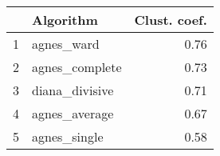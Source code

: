 \begin{tabular}{rlr}
  \toprule
 & Algorithm & Clust. coef. \\ 
  \midrule
1 & agnes\_ward & 0.76 \\ 
  2 & agnes\_complete & 0.73 \\ 
  3 & diana\_divisive & 0.71 \\ 
  4 & agnes\_average & 0.67 \\ 
  5 & agnes\_single & 0.58 \\ 
   \bottomrule
\end{tabular}

